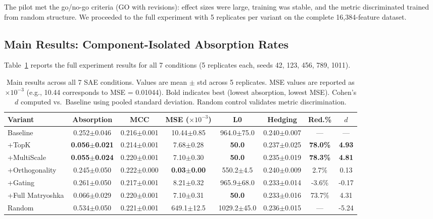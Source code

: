 \documentclass{article}
\begin{document}
The pilot met the go/no-go criteria (GO with revisions): effect sizes were large, training was stable, and the metric discriminated trained from random structure. We proceeded to the full experiment with 5 replicates per variant on the complete 16,384-feature dataset.

\subsection{Main Results: Component-Isolated Absorption Rates}

Table~\ref{tab:main} reports the full experiment results for all 7 conditions (5 replicates each, seeds 42, 123, 456, 789, 1011).

\begin{table}[t]
\caption{Main results across all 7 SAE conditions. Values are mean $\pm$ std across 5 replicates. MSE values are reported as $\times 10^{-3}$ (e.g., 10.44 corresponds to MSE = 0.01044). Bold indicates best (lowest absorption, lowest MSE). Cohen's $d$ computed vs.~Baseline using pooled standard deviation. Random control validates metric discrimination.}
\label{tab:main}
\centering
\scriptsize
\setlength{\tabcolsep}{3pt}
\begin{tabular}{lccccccc}
\toprule
Variant & Absorption & MCC & MSE ($\times 10^{-3}$) & L0 & Hedging & Red.\% & $d$ \\
\midrule
Baseline & 0.252$\pm$0.046 & 0.216$\pm$0.001 & 10.44$\pm$0.85 & 964.0$\pm$75.0 & 0.240$\pm$0.007 & --- & --- \\
+TopK & \textbf{0.056$\pm$0.021} & 0.214$\pm$0.001 & 7.68$\pm$0.28 & \textbf{50.0} & 0.237$\pm$0.025 & \textbf{78.0\%} & \textbf{4.93} \\
+MultiScale & \textbf{0.055$\pm$0.024} & 0.220$\pm$0.001 & 7.10$\pm$0.30 & \textbf{50.0} & 0.235$\pm$0.019 & \textbf{78.3\%} & \textbf{4.81} \\
+Orthogonality & 0.245$\pm$0.050 & 0.222$\pm$0.000 & \textbf{0.03$\pm$0.00} & 550.2$\pm$4.5 & 0.240$\pm$0.009 & 2.7\% & 0.13 \\
+Gating & 0.261$\pm$0.050 & 0.217$\pm$0.001 & 8.21$\pm$0.32 & 965.9$\pm$68.0 & 0.233$\pm$0.014 & -3.6\% & -0.17 \\
+Full Matryoshka & 0.066$\pm$0.029 & 0.220$\pm$0.001 & 7.10$\pm$0.31 & \textbf{50.0} & 0.233$\pm$0.016 & 73.7\% & 4.31 \\
Random & 0.534$\pm$0.050 & 0.221$\pm$0.001 & 649.1$\pm$12.5 & 1029.2$\pm$45.0 & 0.236$\pm$0.015 & --- & -5.24 \\
\bottomrule
\end{tabular}
\end{table}
\end{document}
